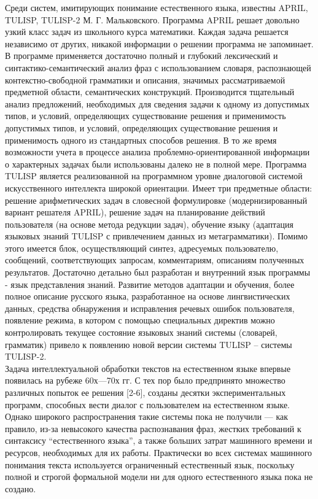 Среди систем, имитирующих понимание естественного языка, известны APRIL, TULISP, TULISP-2 М. Г. Мальковского. Программа APRIL решает довольно узкий класс задач из школьного курса математики. Каждая задача решается независимо от других, никакой информации о решении программа не запоминает. В программе применяется достаточно полный и глубокий лексический и синтактико-семантический анализ фраз с использованием словаря, распознающей контекстно-свободной грамматики и описания, значимых рассматриваемой предметной области, семантических конструкций. Производится тщательный анализ предложений, необходимых для сведения задачи к одному из допустимых типов, и условий, определяющих существование решения и применимость допустимых типов, и условий, определяющих существование решения и применимость одного из стандартных способов решения. В то же время возможности учета в процессе анализа проблемно-ориентированной информации о характерных задачах были использованы далеко не в полной мере. Программа TULISP является реализованной на программном уровне диалоговой системой искусственного интеллекта широкой ориентации. Имеет три предметные области: решение арифметических задач в словесной формулировке (модернизированный вариант решателя APRIL), решение задач на планирование действий пользователя (на основе метода редукции задач), обучение языку (адаптация языковых знаний TULISP с привлечением данных из метаграмматики). Помимо этого имеется блок, осуществляющий синтез, адресуемых пользователю, сообщений, соответствующих запросам, комментариям, описаниям полученных результатов. Достаточно детально был разработан и внутренний язык программы - язык представления знаний. Развитие методов адаптации и обучения, более полное описание русского языка, разработанное на основе лингвистических данных, средства обнаружения и исправления речевых ошибок пользователя, появление режима, в котором с помощью специальных директив можно контролировать текущее состояние языковых знаний системы (словарей, грамматик) привело к появлению новой версии системы TULISP – системы TULISP-2. \\
Задача интеллектуальной обработки текстов на естественном языке впервые появилась на рубеже 60х—70х гг. С тех пор было предпринято множество различных попыток ее решения [2-6], созданы десятки экспериментальных программ, способных вести диалог с пользователем на естественном языке. Однако широкого распространения такие системы пока не получили — как правило, из-за невысокого качества распознавания фраз, жестких требований к синтаксису “естественного языка”, а также больших затрат машинного времени и ресурсов, необходимых для их работы. Практически во всех системах машинного понимания текста используется ограниченный естественный язык, поскольку полной и строгой формальной модели ни для одного естественного языка пока не создано. \\
